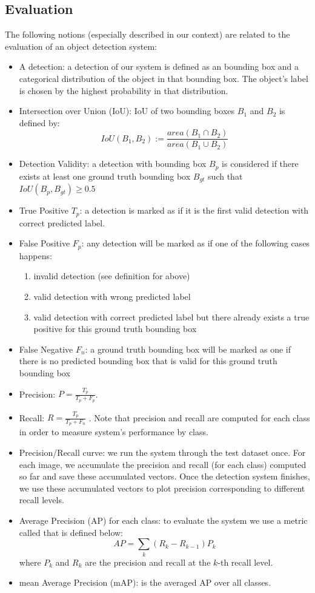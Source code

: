 \subsection{Evaluation}
The following notions (especially described in our context) are related to the evaluation of an object detection system:
\begin{itemize}
	\item A detection: a detection of our system is defined as an bounding box and a categorical distribution of the object in that bounding box. The object's label is chosen by the highest probability in that distribution.
	\item Intersection over Union (IoU): IoU of two bounding boxes $B_1$ and $B_2$ is defined by: $$IoU(B_1, B_2) := \frac{area(B_1 \cap B_2)}{area(B_1 \cup B_2)}$$
	\item Detection Validity: a detection with bounding box $B_p$ is considered  if there exists at least one ground truth bounding box $B_{gt}$ such that $IoU(B_p, B_{gt}) \geq 0.5$
	\item True Positive $T_p$: a detection is marked as  if it is the first valid detection with correct predicted label.
	\item False Positive $F_p$: any detection will be marked as  if one of the following cases happens:
	\begin{enumerate}
		\item invalid detection (see definition for  above)
		\item valid detection with wrong predicted label
		\item valid detection with correct predicted label but there already exists a true positive for this ground truth bounding box
	\end{enumerate}
	\item False Negative $F_n$: a ground truth bounding box will be marked as one  if there is no predicted bounding box that is valid for this ground truth bounding box
	\item Precision: $P = \frac{T_p}{T_p + F_p}$. 
	\item Recall: $R = \frac{T_p}{T_p + F_n}$ . Note that precision and recall are computed for each class in order to measure system's performance by class.
	\item Precision/Recall curve: we run the system through the test dataset once. For each image, we accumulate the precision and recall (for each class) computed so far and save these accumulated vectors. Once the detection system finishes, we use these accumulated vectors to plot precision corresponding to different recall levels.
	\item Average Precision (AP) for each class: to evaluate the system we use a metric called  that is defined below:
	$$ AP = \sum_k (R_k - R_{k-1})P_k $$
	where $P_k$ and $R_k$ are the precision and recall at the $k$-th recall level.
	\item mean Average Precision (mAP): is the averaged AP over all classes.
\end{itemize}
